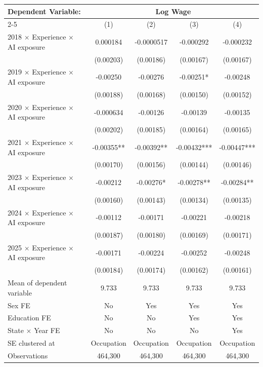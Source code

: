 \def\sym#1{\ifmmode^{#1}\else\(^{#1}\)\fi}
\begin{tabular}{l*{4}{c}}
\toprule
Dependent Variable: & \multicolumn{4}{c}{Log Wage} \\
\cmidrule(lr){2-5}
 & (1) & (2) & (3) & (4) \\
\midrule
2018 $\times$ Experience $\times$ AI exposure&    0.000184   &  -0.0000517   &   -0.000292   &   -0.000232   \\
            &   (0.00203)   &   (0.00186)   &   (0.00167)   &   (0.00167)   \\
2019 $\times$ Experience $\times$ AI exposure&    -0.00250   &    -0.00276   &    -0.00251*  &    -0.00248   \\
            &   (0.00188)   &   (0.00168)   &   (0.00150)   &   (0.00152)   \\
2020 $\times$ Experience $\times$ AI exposure&   -0.000634   &    -0.00126   &    -0.00139   &    -0.00135   \\
            &   (0.00202)   &   (0.00185)   &   (0.00164)   &   (0.00165)   \\
2021 $\times$ Experience $\times$ AI exposure&    -0.00355** &    -0.00392** &    -0.00432***&    -0.00447***\\
            &   (0.00170)   &   (0.00156)   &   (0.00144)   &   (0.00146)   \\
2023 $\times$ Experience $\times$ AI exposure&    -0.00212   &    -0.00276*  &    -0.00278** &    -0.00284** \\
            &   (0.00160)   &   (0.00143)   &   (0.00134)   &   (0.00135)   \\
2024 $\times$ Experience $\times$ AI exposure&    -0.00112   &    -0.00171   &    -0.00221   &    -0.00218   \\
            &   (0.00187)   &   (0.00180)   &   (0.00169)   &   (0.00171)   \\
2025 $\times$ Experience $\times$ AI exposure&    -0.00171   &    -0.00224   &    -0.00252   &    -0.00248   \\
            &   (0.00184)   &   (0.00174)   &   (0.00162)   &   (0.00161)   \\
\midrule
Mean of dependent variable&       9.733   &       9.733   &       9.733   &       9.733   \\
Sex FE      &          No   &         Yes   &         Yes   &         Yes   \\
Education FE&          No   &          No   &         Yes   &         Yes   \\
State $\times$ Year FE&          No   &          No   &          No   &         Yes   \\
SE clustered at&  Occupation   &  Occupation   &  Occupation   &  Occupation   \\
Observations&     464,300   &     464,300   &     464,300   &     464,300   \\
\bottomrule
\end{tabular}
